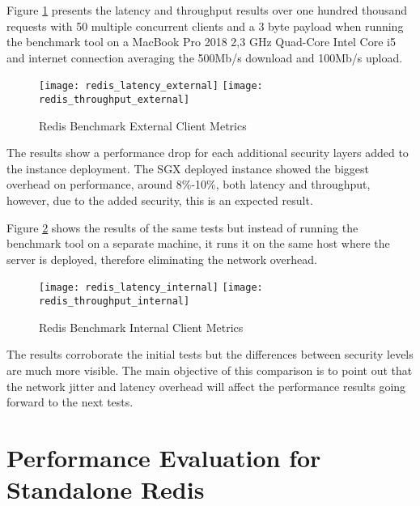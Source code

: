 Figure \ref{fig:redis_benchmark_external_metrics} presents the latency and throughput results over one hundred thousand requests with 50 multiple concurrent clients and a 3 byte payload when running the benchmark tool on a MacBook Pro 2018 2,3 GHz Quad-Core Intel Core i5 and internet connection averaging the 500Mb/s download and 100Mb/s upload.

\begin{figure}[htbp]
  \centering
    {\texttt{[image: redis\_latency\_external]}}%
    {\texttt{[image: redis\_throughput\_external]}}%
  \caption{Redis Benchmark External Client Metrics}
  \label{fig:redis_benchmark_external_metrics}
\end{figure}

The results show a performance drop for each additional security layers added to the instance deployment. The \gls{SGX} deployed instance showed the biggest overhead on performance, around 8\%-10\%, both latency and throughput, however, due to the added security, this is an expected result.

Figure \ref{fig:redis_benchmark_internal_metrics} shows the results of the same tests but instead of running the benchmark tool on a separate machine, it runs it on the same host where the server is deployed, therefore eliminating the network overhead.

\begin{figure}[htbp]
  \centering
    {\texttt{[image: redis\_latency\_internal]}}%
    {\texttt{[image: redis\_throughput\_internal]}}%
  \caption{Redis Benchmark Internal Client Metrics}
  \label{fig:redis_benchmark_internal_metrics}
\end{figure}

The results corroborate the initial tests but the differences between security levels are much more visible. The main objective of this comparison is to point out that the network jitter and latency overhead will affect the performance results going forward to the next tests.

\section{Performance Evaluation for Standalone Redis}
\label{sec:performance_evaluation_standalone_redis}

